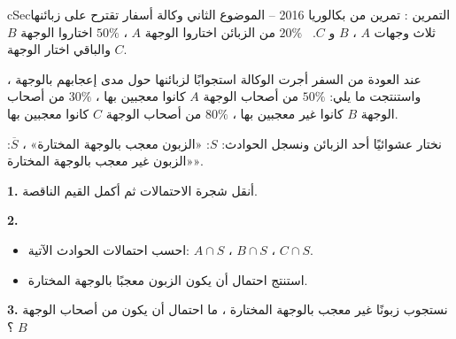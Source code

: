 \documentclass[12pt,a4paper]{article}
\newenvironment{BOX}[2]{\begin{otherlanguage}{english}\begin{arbox}{#1}{#2}}{\end{arbox}\end{otherlanguage}}
\newcounter{exo}
\newenvironment{tamrin}[1]{\stepcounter{exo}\begin{BOX}{cSec}{التمرين \theexo: #1}}{\end{BOX}}
\newenvironment{LTR}{\begin{otherlanguage}{english}}{\end{otherlanguage}}
\renewcommand{\ldots}{\mathinner{\ldotp\ldotp\ldotp}}
\newenvironment{sq}{\begin{itemize}[leftmargin=2.4em,itemsep=3pt]}{\end{itemize}}
\newcommand{\qa}{\item[(أ)]}\newcommand{\qb}{\item[(ب)]}\newcommand{\qc}{\item[(جـ)]}\newcommand{\qd}{\item[(د)]}\newcommand{\qe}{\item[(هـ)]}
\newcommand{\QQ}[1]{\par\smallskip\textbf{#1.} }
\begin{document}
\begin{tamrin}{تمرين من بكالوريا 2016 -- الموضوع الثاني}
وكالة أسفار تقترح على زبائنها ثلاث وجهات $A$ ، $B$ و $C$. \ $20\%$ من الزبائن اختاروا الوجهة $A$ ، $50\%$ اختاروا الوجهة $B$ والباقي اختار الوجهة $C$.
\par عند العودة من السفر أجرت الوكالة استجوابًا لزبائنها حول مدى إعجابهم بالوجهة ، واستنتجت ما يلي: $50\%$ من أصحاب الوجهة $A$ كانوا معجبين بها ، $30\%$ من أصحاب الوجهة $B$ كانوا غير معجبين بها ، $80\%$ من أصحاب الوجهة $C$ كانوا معجبين بها.
\par نختار عشوائيًا أحد الزبائن ونسجل الحوادث: $S$: «الزبون معجب بالوجهة المختارة» ، $\overline S$: «الزبون غير معجب بالوجهة المختارة».
\QQ{1} أنقل شجرة الاحتمالات ثم أكمل القيم الناقصة.
\QQ{2}
\begin{sq}
\qa احسب احتمالات الحوادث الآتية: $A\cap S$ ، $B\cap S$ ، $C\cap S$.
\qb استنتج احتمال أن يكون الزبون معجبًا بالوجهة المختارة.
\end{sq}
\QQ{3} نستجوب زبونًا غير معجب بالوجهة المختارة ، ما احتمال أن يكون من أصحاب الوجهة $B$ ؟
\par\begin{center}\begin{LTR}\end{LTR}\end{center}
\end{tamrin}
\end{document}
